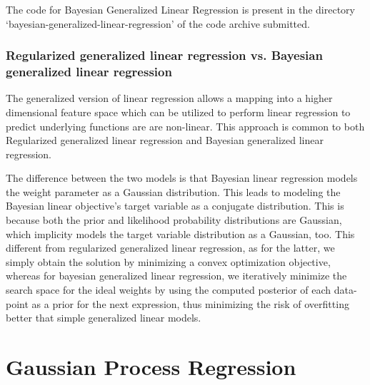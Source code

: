 \documentclass[parskip=full]{scrartcl}
\begin{document}
        The code for Bayesian Generalized Linear Regression is present in the directory `bayesian-generalized-linear-regression' of the code archive submitted.

        \subsubsection*{Regularized generalized linear regression vs. Bayesian generalized linear regression} %
        \label{ssub:regularized_generalized_linear_regression_vs_bayesian_generalized_linear_regression}

            The generalized version of linear regression allows a mapping into a higher dimensional feature space which can be utilized to perform linear regression to predict underlying functions are are non-linear. This approach is common to both Regularized generalized linear regression and Bayesian generalized linear regression.

            The difference between the two models is that Bayesian linear regression models the weight parameter as a Gaussian distribution. This leads to modeling the Bayesian linear objective's target variable as a conjugate distribution. This is because both the prior and likelihood probability distributions are Gaussian, which implicity models the target variable distribution as a Gaussian, too. This different from regularized generalized linear regression, as for the latter, we simply obtain the solution by minimizing a convex optimization objective, whereas for bayesian generalized linear regression, we iteratively minimize the search space for the ideal weights by using the computed posterior of each data-point as a prior for the next expression, thus minimizing the risk of overfitting better that simple generalized linear models.
        
    

    \section{Gaussian Process Regression} %
    \label{sec:gaussian_process_regression}
    

\end{document}
